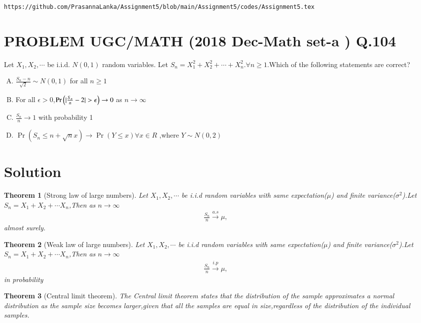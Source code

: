 \documentclass[journal,12pt,twocolumn]{IEEEtran}
\newtheorem{theorem}{Theorem}[section]
\begin{document}
\begin{lstlisting}
https://github.com/PrasannaLanka/Assignment5/blob/main/Assignment5/codes/Assignment5.tex
\end{lstlisting}

\section*{PROBLEM UGC/MATH (2018 Dec-Math set-a ) Q.104}
Let $X_1,X_2, \cdots$ be i.i.d. $N(0,1)$ random variables. Let $S_{n}=X_{1}^2+X_{2}^2+\cdots+X_{n}^2.\forall n\geq 1. $Which of the following statements are correct?
\begin{enumerate}[(A)]
\setlength\itemsep{1em}
\item $\frac{S_{n}-n}{\sqrt{2}}\sim N(0,1)$ for all $n\geq 1$
\item For all $\epsilon > 0$,$\Pr{\ensuremath{\left(\vert\frac{S_n}{n}-2\vert>\epsilon\right)}}\to 0$ as $n \to \infty$
\item $\frac{S_{n}}{n} \to 1$ with probability 1
\item $\Pr({S_{n} \leq n+\sqrt{n}x}) \to \Pr({Y \leq x}) \forall x\in R$ ,where $Y \sim N(0,2)$
\end{enumerate}




 \section*{Solution}
 \begin{theorem}[Strong law of large numbers]
\label{theorem1}
Let $X_1,X_2,\cdots $ be i.i.d random variables with same expectation($\mu$) and finite variance($\sigma^2$).Let $S_{n}=X_1+X_2+\cdots X_n$,Then as $n \to \infty$
\begin{align}
    \frac{S_n}{n} \xrightarrow{a.s}  \mu,
\end{align}
almost surely.
\end{theorem}

\begin{theorem}[Weak law of large numbers]
\label{theorem}
Let $X_1,X_2,\cdots $ be i.i.d random variables with same expectation($\mu$) and finite variance($\sigma^2$).Let $S_{n}=X_1+X_2+\cdots X_n$,Then as $n \to \infty$
\begin{align}
    \frac{S_n}{n} \xrightarrow{i.p}  \mu,
\end{align}
in probability
\end{theorem}

\begin{theorem}[Central limit theorem]
\label{theorem3}
The Central limit theorem states that the distribution of the sample approximates a normal distribution as the sample size becomes larger,given that all the samples are equal in size,regardless of the distribution of the individual samples.
\end{theorem}
\end{document}

